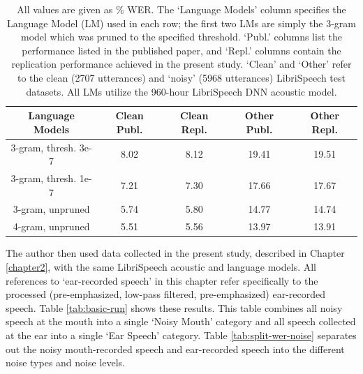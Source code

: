\begin{table}[h]
\begin{center}
\begin{tabular}{| c || c | c | c | c |} \hline
Language Models & Clean Publ. & Clean Repl. & Other Publ. & Other Repl. \\ \hline\hline
3-gram, thresh. 3e-7 & 8.02 & 8.12 & 19.41 & 19.51 \\ \hline
3-gram, thresh. 1e-7 & 7.21 & 7.30 & 17.66 & 17.67 \\ \hline
3-gram, unpruned & 5.74 & 5.80 & 14.77 & 14.74 \\ \hline
4-gram, unpruned & 5.51 & 5.56 & 13.97 & 13.91 \\ \hline
\end{tabular}
\end{center}
\caption{All values are given as \% WER.  The `Language Models' column specifies the Language Model (LM) used in each row; the first two LMs are simply the 3-gram model which was pruned to the specified threshold.  `Publ.' columns list the performance listed in the published paper, and `Repl.' columns contain the replication performance achieved in the present study.  `Clean' and `Other' refer to the clean (2707 utterances) and `noisy' (5968 utterances) LibriSpeech test datasets. All LMs utilize the 960-hour LibriSpeech DNN acoustic model.}\label{tab:sanity-check}
\end{table}

The author then used data collected in the present study, described in Chapter \ref{chapter2}, with the same LibriSpeech acoustic and language models.  All references to `ear-recorded speech' in this chapter refer specifically to the processed (pre-emphasized, low-pass filtered, pre-emphasized) ear-recorded speech.  Table \ref{tab:basic-run} shows these results.  This table combines all noisy speech at the mouth into a single `Noisy Mouth' category and all speech collected at the ear into a single `Ear Speech' category.  Table \ref{tab:split-wer-noise} separates out the noisy mouth-recorded speech and ear-recorded speech into the different noise types and noise levels.

